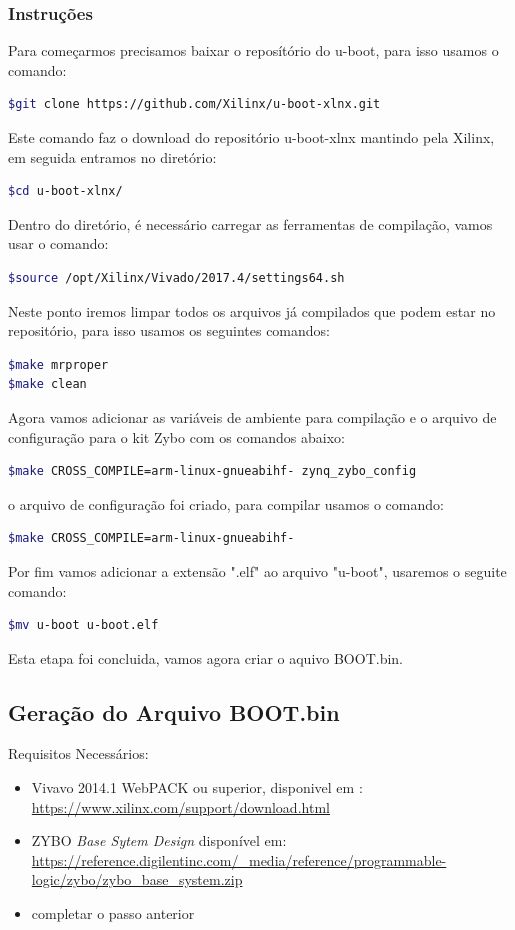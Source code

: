 \begin{anexosenv}
\begin{itemize}
\end{itemize} 
\subsubsection{Instruções}
Para começarmos precisamos baixar o reposítório do u-boot, para isso usamos o comando:
\begin{lstlisting}[language=bash]
$git clone https://github.com/Xilinx/u-boot-xlnx.git
\end{lstlisting}
Este comando faz o download do repositório u-boot-xlnx mantindo pela Xilinx, em seguida entramos no diretório:

\begin{lstlisting}[language=bash]
$cd u-boot-xlnx/
\end{lstlisting}
Dentro do diretório, é necessário carregar as ferramentas de compilação, vamos usar o comando:

\begin{lstlisting}[language=bash]
$source /opt/Xilinx/Vivado/2017.4/settings64.sh
\end{lstlisting}
Neste ponto iremos limpar todos os arquivos já compilados que podem estar no repositório, para isso usamos os seguintes comandos:
\begin{lstlisting}[language=bash]
$make mrproper
$make clean
\end{lstlisting}
Agora vamos adicionar as variáveis de ambiente para compilação e o arquivo de configuração para o kit Zybo com os comandos abaixo:
\begin{lstlisting}[language=bash]
$make CROSS_COMPILE=arm-linux-gnueabihf- zynq_zybo_config
\end{lstlisting}
o arquivo de configuração foi criado, para compilar usamos o comando:
\begin{lstlisting}[language=bash]
$make CROSS_COMPILE=arm-linux-gnueabihf-
\end{lstlisting}
Por fim vamos adicionar a extensão ".elf" ao arquivo "u-boot", usaremos o seguite comando:
\begin{lstlisting}[language=bash]
$mv u-boot u-boot.elf
\end{lstlisting}

Esta etapa foi concluida, vamos agora criar o aquivo BOOT.bin.


 
 

\subsection{Geração do Arquivo BOOT.bin}
Requisitos Necessários:
\begin{itemize}
\item Vivavo 2014.1 WebPACK ou superior, disponivel em : \url{https://www.xilinx.com/support/download.html}
\item ZYBO \textit{Base Sytem Design}  disponível em: \url{https://reference.digilentinc.com/_media/reference/programmable-logic/zybo/zybo_base_system.zip}
\item completar o passo anterior


\end{itemize}
\end{anexosenv}
